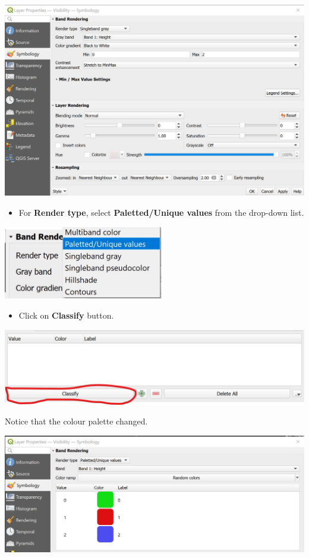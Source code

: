 \documentclass[
  letterpaper,
  DIV=11,
  numbers=noendperiod]{scrreprt}
\providecommand{\tightlist}{%
  \setlength{\itemsep}{0pt}\setlength{\parskip}{0pt}}\usepackage{longtable,booktabs,array}
\begin{document}
\includegraphics{./img06/image80.jpg}

\begin{itemize}
\tightlist
\item
  For \textbf{Render type}, select \textbf{Paletted/Unique values} from
  the drop-down list.
\end{itemize}

\includegraphics[width=2.75in,height=\textheight]{./img06/image81.jpg}

\begin{itemize}
\tightlist
\item
  Click on \textbf{Classify} button.
\end{itemize}

\includegraphics{./img06/image82.jpg}

Notice that the colour palette changed.

\includegraphics{./img06/image83.jpg}
\end{document}
